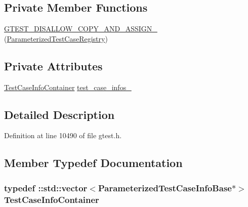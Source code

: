 \subsection*{\-Private \-Member \-Functions}
\begin{DoxyCompactItemize}
\item 
\hyperlink{classtesting_1_1internal_1_1ParameterizedTestCaseRegistry_a1ff279d84c19cc5ce9c43e9d590e72ce}{\-G\-T\-E\-S\-T\-\_\-\-D\-I\-S\-A\-L\-L\-O\-W\-\_\-\-C\-O\-P\-Y\-\_\-\-A\-N\-D\-\_\-\-A\-S\-S\-I\-G\-N\-\_\-} (\hyperlink{classtesting_1_1internal_1_1ParameterizedTestCaseRegistry}{\-Parameterized\-Test\-Case\-Registry})
\end{DoxyCompactItemize}
\subsection*{\-Private \-Attributes}
\begin{DoxyCompactItemize}
\item 
\hyperlink{classtesting_1_1internal_1_1ParameterizedTestCaseRegistry_a10ec5a4c58b471acb6ee18cbdf3388f3}{\-Test\-Case\-Info\-Container} \hyperlink{classtesting_1_1internal_1_1ParameterizedTestCaseRegistry_a4b32d9d227772ac373b2677619134b03}{test\-\_\-case\-\_\-infos\-\_\-}
\end{DoxyCompactItemize}


\subsection{\-Detailed \-Description}


\-Definition at line 10490 of file gtest.\-h.



\subsection{\-Member \-Typedef \-Documentation}
\hypertarget{classtesting_1_1internal_1_1ParameterizedTestCaseRegistry_a10ec5a4c58b471acb6ee18cbdf3388f3}{
\subsubsection[{\-Test\-Case\-Info\-Container}]{\setlength{\rightskip}{0pt plus 5cm}typedef \-::std\-::vector$<${\bf \-Parameterized\-Test\-Case\-Info\-Base}$\ast$$>$ {\bf \-Test\-Case\-Info\-Container}}}\label{d3/dd0/classtesting_1_1internal_1_1ParameterizedTestCaseRegistry_a10ec5a4c58b471acb6ee18cbdf3388f3}


